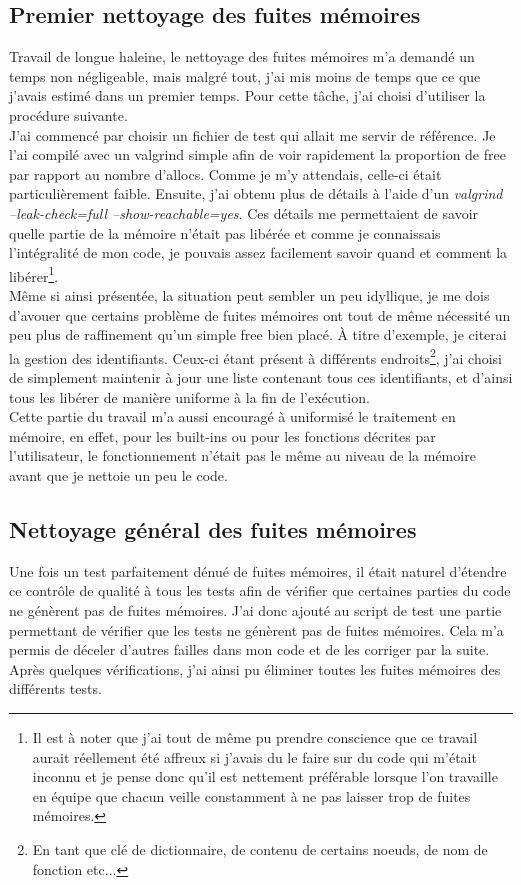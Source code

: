 \documentclass[12pt]{article}
\begin{document}
\subsection{Premier nettoyage des fuites mémoires}
Travail de longue haleine, le nettoyage des fuites mémoires m'a demandé un
temps non négligeable, mais malgré tout, j'ai mis moins de temps que ce que
j'avais estimé dans un premier temps. Pour cette tâche, j'ai choisi d'utiliser
la procédure suivante.\\

J'ai commencé par choisir un fichier de test qui allait me servir de
référence. Je l'ai compilé avec un valgrind simple afin de voir rapidement la
proportion de free par rapport au nombre d'allocs. Comme je m'y attendais,
celle-ci était particulièrement faible. Ensuite, j'ai obtenu plus de détails
à l'aide d'un {\em valgrind --leak-check=full --show-reachable=yes}. Ces
détails me permettaient de savoir quelle partie de la mémoire n'était pas
libérée et comme je connaissais l'intégralité de mon code, je pouvais assez
facilement savoir quand et comment la libérer\footnote{Il est à noter que
j'ai tout de même pu prendre conscience que ce travail aurait réellement été
affreux si j'avais du le faire sur du code qui m'était inconnu et je pense
donc qu'il est nettement préférable lorsque l'on travaille en équipe que
chacun veille constamment à ne pas laisser trop de fuites mémoires.}.\\

Même si ainsi présentée, la situation peut sembler un peu idyllique, je me
dois d'avouer que certains problème de fuites mémoires ont tout de même
nécessité un peu plus de raffinement qu'un simple free bien placé. À titre
d'exemple, je citerai la gestion des identifiants. Ceux-ci étant présent à
différents endroits\footnote{En tant que clé de dictionnaire, de contenu de
certains noeuds, de nom de fonction etc...}, j'ai choisi de simplement
maintenir à jour une liste contenant tous ces identifiants, et d'ainsi tous
les libérer de manière uniforme à la fin de l'exécution.\\

Cette partie du travail m'a aussi encouragé à uniformisé le traitement en
mémoire, en effet, pour les built-ins ou pour les fonctions décrites par
l'utilisateur, le fonctionnement n'était pas le même au niveau de la mémoire
avant que je nettoie un peu le code.

\subsection{Nettoyage général des fuites mémoires}
Une fois un test parfaitement dénué de fuites mémoires, il était naturel
d'étendre ce contrôle de qualité à tous les tests afin de vérifier que
certaines parties du code ne génèrent pas de fuites mémoires. J'ai donc
ajouté au script de test une partie permettant de vérifier que les tests ne
génèrent pas de fuites mémoires. Cela m'a permis de déceler d'autres failles
dans mon code et de les corriger par la suite. Après quelques vérifications,
j'ai ainsi pu éliminer toutes les fuites mémoires des différents tests.
\end{document}
